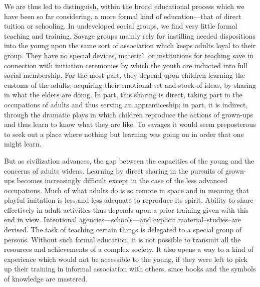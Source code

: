 \begin{linenumbers*}
\indent We are thus led to distinguish, within the broad educational process which we have been so far considering, a more formal kind of education—that of direct tuition or schooling. In undeveloped social groups, we find very little formal teaching and training. Savage groups mainly rely for instilling needed dispositions into the young upon the same sort of association which keeps adults loyal to their group. They have no special devices, material, or institutions for teaching save in connection with initiation ceremonies by which the youth are inducted into full social membership. For the most part, they depend upon children learning the customs of the adults, acquiring their emotional set and stock of ideas, by sharing in what the elders are doing. In part, this sharing is direct, taking part in the occupations of adults and thus serving an apprenticeship; in part, it is indirect, through the dramatic plays in which children reproduce the actions of grown-ups and thus learn to know what they are like. To savages it would seem preposterous to seek out a place where nothing but learning was going on in order that one might learn.

\indent But as civilization advances, the gap between the capacities of the young and the concerns of adults widens. Learning by direct sharing in the pursuits of grown-ups becomes increasingly difficult except in the case of the less advanced occupations. Much of what adults do is so remote in space and in meaning that playful imitation is less and less adequate to reproduce its spirit. Ability to share effectively in adult activities thus depends upon a prior training given with this end in view. Intentional agencies—schools—and explicit material--studies--are devised. The task of teaching certain things is delegated to a special group of persons.
Without such formal education, it is not possible to transmit all the resources and achievements of a complex society. It also opens a way to a kind of experience which would not be accessible to the young, if they were left to pick up their training in informal association with others, since books and the symbols of knowledge are mastered.


\end{linenumbers*}
